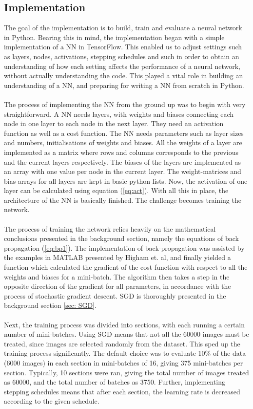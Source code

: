 \documentclass{article}
\begin{document}
\subsection{Implementation}
The goal of the implementation is to build, train and evaluate a neural network in Python. Bearing this in mind, the implementation began with a simple implementation of a NN in TensorFlow. This enabled us to adjust settings such as layers, nodes, activations, stepping schedules and such in order to obtain an understanding of how each setting affects the performance of a neural network, without actually understanding the code. This played a vital role in building an understanding of a NN, and preparing for writing a NN from scratch in Python.\\\\
The process of implementing the NN from the ground up was to begin with very straightforward. A NN needs layers, with weights and biases connecting each node in one layer to each node in the next layer. They need an activation function as well as a cost function. The NN needs parameters such as layer sizes and numbers, initialisations of weights and biases. All the weights of a layer are implemented as a matrix where rows and columns corresponds to the previous and the current layers respectively. The biases of the layers are implemented as an array with one value per node in the current layer. The weight-matrices and bias-arrays for all layers are kept in basic python-lists. Now, the activation of one layer can be calculated using equation (\ref{eq:act}). With all this in place, the architecture of the NN is basically finished. The challenge becomes training the network. \\\\
The process of training the network relies heavily on the mathematical conclusions presented in the background section, namely the equations of back propagation (\ref{eq:bp1}). The implementation of back-propagation was assisted by the examples in MATLAB presented by Higham et. al, and finally yielded a function which calculated the gradient of the cost function with respect to all the weights and biases for a mini-batch. The algorithm then takes a step in the opposite direction of the gradient for all parameters, in accordance with the process of stochastic gradient descent. SGD is thoroughly presented in the background section \ref{sec: SGD}. \\\\
Next, the training process was divided into sections, with each running a certain number of mini-batches. Using SGD means that not all the 60000 images must be treated, since images are selected randomly from the dataset. This sped up the training process significantly. The default choice was to evaluate 10\% of the data (6000 images) in each section in mini-batches of 16, giving 375 mini-batches per section. Typically, 10 sections were ran, giving the total number of images treated as 60000, and the total number of batches as 3750. Further, implementing stepping schedules means that after each section, the learning rate is decreased according to the given schedule. \\\\
\end{document}
